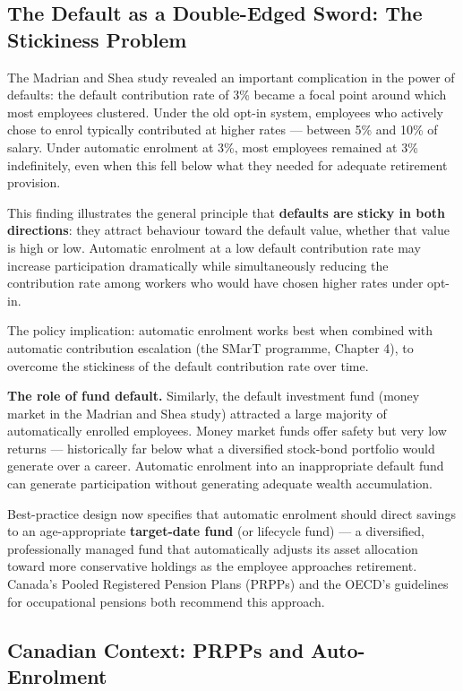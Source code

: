\documentclass[12pt, letterpaper]{article}
\begin{document}
\subsection{The Default as a Double-Edged Sword: The Stickiness Problem}


The Madrian and Shea study revealed an important complication in the power of defaults: the default contribution rate of 3\% became a focal point around which most employees clustered. Under the old opt-in system, employees who actively chose to enrol typically contributed at higher rates --- between 5\% and 10\% of salary. Under automatic enrolment at 3\%, most employees remained at 3\% indefinitely, even when this fell below what they needed for adequate retirement provision.

This finding illustrates the general principle that \textbf{defaults are sticky in both directions}: they attract behaviour toward the default value, whether that value is high or low. Automatic enrolment at a low default contribution rate may increase participation dramatically while simultaneously reducing the contribution rate among workers who would have chosen higher rates under opt-in.

The policy implication: automatic enrolment works best when combined with automatic contribution escalation (the SMarT programme, Chapter 4), to overcome the stickiness of the default contribution rate over time.

\textbf{The role of fund default.} Similarly, the default investment fund (money market in the Madrian and Shea study) attracted a large majority of automatically enrolled employees. Money market funds offer safety but very low returns --- historically far below what a diversified stock-bond portfolio would generate over a career. Automatic enrolment into an inappropriate default fund can generate participation without generating adequate wealth accumulation.

Best-practice design now specifies that automatic enrolment should direct savings to an age-appropriate \textbf{target-date fund} (or lifecycle fund) --- a diversified, professionally managed fund that automatically adjusts its asset allocation toward more conservative holdings as the employee approaches retirement. Canada's Pooled Registered Pension Plans (PRPPs) and the OECD's guidelines for occupational pensions both recommend this approach.


\subsection{Canadian Context: PRPPs and Auto-Enrolment}
\end{document}
